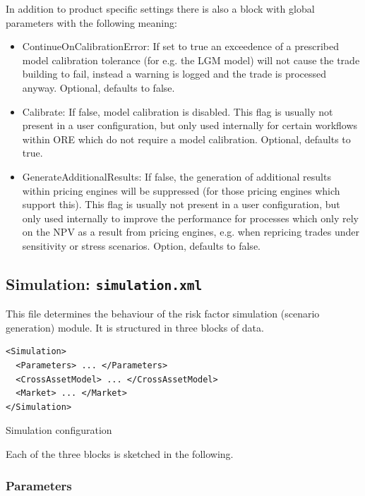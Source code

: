 \documentclass[12pt, a4paper]{article}
\begin{document}
{{\medskip
In addition to product specific settings there is also a block with global parameters with the following meaning:
\begin{itemize}
\item ContinueOnCalibrationError: If set to true an exceedence of a prescribed model calibration tolerance (for e.g. the
  LGM model) will not cause the trade building to fail, instead a warning is logged and the trade is processed
  anyway. Optional, defaults to false.
\item Calibrate: If false, model calibration is disabled. This flag is usually not present in a user configuration, but
  only used internally for certain workflows within ORE which do not require a model calibration. Optional, defaults to
  true.
\item GenerateAdditionalResults: If false, the generation of additional results within pricing engines will be
  suppressed (for those pricing engines which support this). This flag is usually not present in a user configuration,
  but only used internally to improve the performance for processes which only rely on the NPV as a result from pricing
  engines, e.g. when repricing trades under sensitivity or stress scenarios. Option, defaults to false.
\end{itemize}

\subsection{Simulation: {\tt simulation.xml}}\label{sec:simulation}

This file determines the behaviour of the risk factor simulation (scenario generation) module.
It is structured in three blocks of data.

\begin{listing}[H]
\begin{verbatim}
<Simulation>
  <Parameters> ... </Parameters>
  <CrossAssetModel> ... </CrossAssetModel>
  <Market> ... </Market>
</Simulation>
\end{verbatim}
\caption{Simulation configuration}
\label{lst:simulation_configuration}
\end{listing}

Each of the three blocks is sketched in the following.

\subsubsection{Parameters}\label{sec:sim_params}

}}
\end{document}
